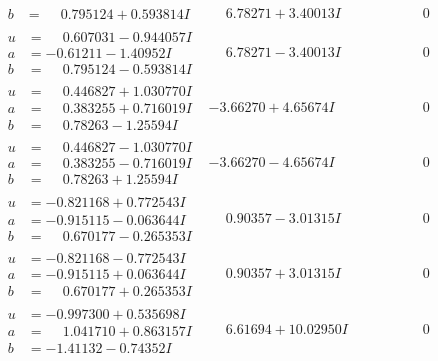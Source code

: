 \documentclass[1p]{elsarticle_modified}
\theoremstyle{definition}
\begin{document}
$$\begin{array}{c|c|c}
\begin{aligned}
b &= \phantom{-}0.795124 + 0.593814 I\end{aligned}
 & \phantom{-}6.78271 + 3.40013 I & \phantom{-0.000000 } 0 \\ \hline\begin{aligned}
u &= \phantom{-}0.607031 - 0.944057 I \\
a &= -0.61211 - 1.40952 I \\
b &= \phantom{-}0.795124 - 0.593814 I\end{aligned}
 & \phantom{-}6.78271 - 3.40013 I & \phantom{-0.000000 } 0 \\ \hline\begin{aligned}
u &= \phantom{-}0.446827 + 1.030770 I \\
a &= \phantom{-}0.383255 + 0.716019 I \\
b &= \phantom{-}0.78263 - 1.25594 I\end{aligned}
 & -3.66270 + 4.65674 I & \phantom{-0.000000 } 0 \\ \hline\begin{aligned}
u &= \phantom{-}0.446827 - 1.030770 I \\
a &= \phantom{-}0.383255 - 0.716019 I \\
b &= \phantom{-}0.78263 + 1.25594 I\end{aligned}
 & -3.66270 - 4.65674 I & \phantom{-0.000000 } 0 \\ \hline\begin{aligned}
u &= -0.821168 + 0.772543 I \\
a &= -0.915115 - 0.063644 I \\
b &= \phantom{-}0.670177 - 0.265353 I\end{aligned}
 & \phantom{-}0.90357 - 3.01315 I & \phantom{-0.000000 } 0 \\ \hline\begin{aligned}
u &= -0.821168 - 0.772543 I \\
a &= -0.915115 + 0.063644 I \\
b &= \phantom{-}0.670177 + 0.265353 I\end{aligned}
 & \phantom{-}0.90357 + 3.01315 I & \phantom{-0.000000 } 0 \\ \hline\begin{aligned}
u &= -0.997300 + 0.535698 I \\
a &= \phantom{-}1.041710 + 0.863157 I \\
b &= -1.41132 - 0.74352 I\end{aligned}
 & \phantom{-}6.61694 + 10.02950 I & \phantom{-0.000000 } 0 \\ \hline\begin{aligned}

\end{aligned}
\end{array}$$
\end{document}
